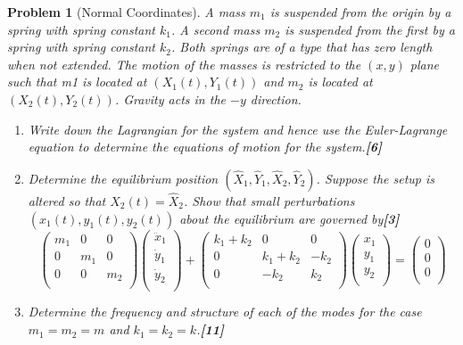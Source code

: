 \documentclass[a4paper]{article}
\theoremstyle{new}
\newtheorem{qns}{Problem}[section]
\begin{document}
\newpage
\begin{qns}[Normal Coordinates]
A mass $m_1$ is suspended from the origin by a spring with spring constant $k_1$. A second mass $m_2$ is suspended from the first by a spring with spring constant $k_2$. Both springs are of a type that has zero length when not extended. The motion of the masses is restricted to the $(x, y)$ plane such that m1 is located at $(X_1(t), Y_1(t))$ and $m_2$ is located at $(X_2(t), Y_2(t))$. Gravity acts in the $−y$ direction.
\begin{enumerate}[label=(\alph*)]
\item Write down the Lagrangian for the system and hence use the Euler-Lagrange equation to determine the equations of motion for the system.\hfill\textbf{[6]}
\item Determine the equilibrium position $(\hat{X}_1,\hat{Y}_1,\hat{X}_2,\hat{Y}_2)$. Suppose the setup is altered so that $X_2(t)=\hat{X}_2$. Show that small perturbations $(x_1(t),y_1(t),y_2(t))$ about the equilibrium are governed by\hfill\textbf{[3]}
$$\begin{pmatrix}m_1&0&0\\0&m_1&0\\0&0&m_2\\\end{pmatrix}\begin{pmatrix}\ddot{x}_1\\\dot{y}_1\\\dot{y}_2\\\end{pmatrix}+\begin{pmatrix}k_1+k_2&0&0\\0&k_1+k_2&-k_2\\0&-k_2&k_2\\\end{pmatrix}\begin{pmatrix}x_1\\y_1\\y_2\\\end{pmatrix}=\begin{pmatrix}0\\0\\0\\\end{pmatrix}$$
\item Determine the frequency and structure of each of the modes for the case $m_1=m_2=m$ and $k_1=k_2=k$.\hfill\textbf{[11]}
\end{enumerate}
\end{qns}
\end{document}
